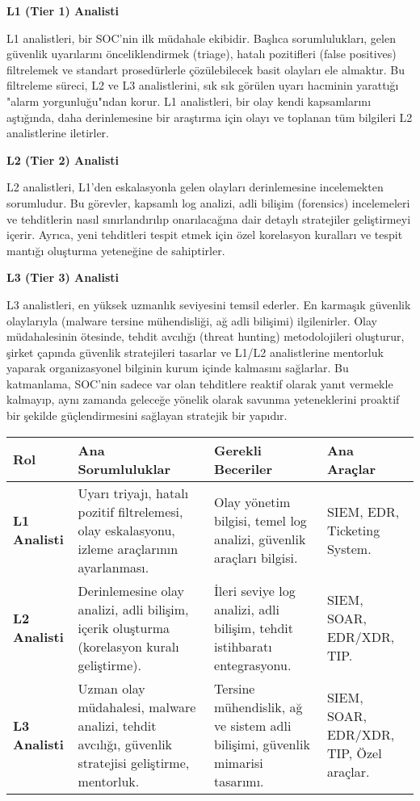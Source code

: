 \textbf{L1 (Tier 1) Analisti}

L1 analistleri, bir SOC'nin ilk müdahale ekibidir. Başlıca sorumlulukları, gelen güvenlik uyarılarını önceliklendirmek (triage), hatalı pozitifleri (false positives) filtrelemek ve standart prosedürlerle çözülebilecek basit olayları ele almaktır. Bu filtreleme süreci, L2 ve L3 analistlerini, sık sık görülen uyarı hacminin yarattığı "alarm yorgunluğu"ndan korur. L1 analistleri, bir olay kendi kapsamlarını aştığında, daha derinlemesine bir araştırma için olayı ve toplanan tüm bilgileri L2 analistlerine iletirler.

\textbf{L2 (Tier 2) Analisti}

L2 analistleri, L1'den eskalasyonla gelen olayları derinlemesine incelemekten sorumludur. Bu görevler, kapsamlı log analizi, adli bilişim (forensics) incelemeleri ve tehditlerin nasıl sınırlandırılıp onarılacağına dair detaylı stratejiler geliştirmeyi içerir. Ayrıca, yeni tehditleri tespit etmek için özel korelasyon kuralları ve tespit mantığı oluşturma yeteneğine de sahiptirler.

\textbf{L3 (Tier 3) Analisti}

L3 analistleri, en yüksek uzmanlık seviyesini temsil ederler. En karmaşık güvenlik olaylarıyla (malware tersine mühendisliği, ağ adli bilişimi) ilgilenirler. Olay müdahalesinin ötesinde, tehdit avcılığı (threat hunting) metodolojileri oluşturur, şirket çapında güvenlik stratejileri tasarlar ve L1/L2 analistlerine mentorluk yaparak organizasyonel bilginin kurum içinde kalmasını sağlarlar. Bu katmanlama, SOC'nin sadece var olan tehditlere reaktif olarak yanıt vermekle kalmayıp, aynı zamanda geleceğe yönelik olarak savunma yeteneklerini proaktif bir şekilde güçlendirmesini sağlayan stratejik bir yapıdır.

\begin{longtable}{|p{2.5cm}|p{3.5cm}|p{3cm}|p{3.5cm}|}
\hline
\textbf{Rol} & \textbf{Ana Sorumluluklar} & \textbf{Gerekli Beceriler} & \textbf{Ana Araçlar} \\
\hline
\textbf{L1 Analisti} & Uyarı triyajı, hatalı pozitif filtrelemesi, olay eskalasyonu, izleme araçlarının ayarlanması. & Olay yönetim bilgisi, temel log analizi, güvenlik araçları bilgisi. & SIEM, EDR, Ticketing System. \\
\hline
\textbf{L2 Analisti} & Derinlemesine olay analizi, adli bilişim, içerik oluşturma (korelasyon kuralı geliştirme). & İleri seviye log analizi, adli bilişim, tehdit istihbaratı entegrasyonu. & SIEM, SOAR, EDR/XDR, TIP. \\
\hline
\textbf{L3 Analisti} & Uzman olay müdahalesi, malware analizi, tehdit avcılığı, güvenlik stratejisi geliştirme, mentorluk. & Tersine mühendislik, ağ ve sistem adli bilişimi, güvenlik mimarisi tasarımı. & SIEM, SOAR, EDR/XDR, TIP, Özel araçlar. \\
\hline
\end{longtable}

